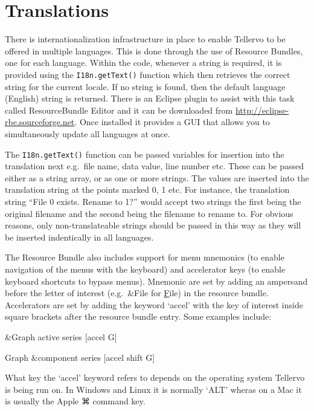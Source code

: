 \section{Translations}
There is internationalization infrastructure in place to enable Tellervo to be offered in multiple languages.  This is done through the use of Resource Bundles, one for each language.  Within the code, whenever a string is required, it is provided using the \verb|I18n.getText()| function which then retrieves the correct string for the current locale.  If no string is found, then the default language (English) string is returned.  There is an Eclipse plugin to assist with this task called ResourceBundle Editor and it can be downloaded from \url{http://eclipse-rbe.sourceforge.net}.  Once installed it provides a GUI that allows you to simultaneously update all languages at once.

The \verb|I18n.getText()| function can be passed variables for insertion into the translation next e.g.\ file name, data value, line number etc.  These can be passed either as a string array, or as one or more strings.  The values are inserted into the translation string at the points marked {0}, {1} etc.  For instance, the translation string ``File {0} exists.  Rename to {1}?'' would accept two strings the first being the original filename and the second being the filename to rename to.  For obvious reasons, only non-translateable strings should be passed in this way as they will be inserted indentically in all languages.

The Resource Bundle also includes support for menu mnemonics (to enable navigation of the menus with the keyboard) and accelerator keys (to enable keyboard shortcuts to bypass menus).  Mnemonic are set by adding an ampersand before the letter of interest (e.g.\ {\&}File for \underline{F}ile) in the resource bundle.  Accelerators are set by adding the keyword `accel' with the key of interest inside square brackets after the resource bundle entry.  Some examples include:

\begin{itemize*}
 \item {\&}Graph active series [accel G]
 \item Graph {\&}component series [accel shift G]
\end{itemize*}

What key the `accel' keyword refers to depends on the operating system Tellervo is being run on.  In Windows and Linux it is normally `ALT' wheras on a Mac it is usually the Apple ⌘ command key. 


